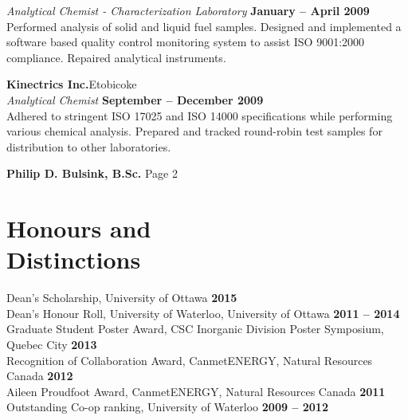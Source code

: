 \documentclass[margin,line]{resume}
\begin{document}
\begin{resume}
    \textsl{Analytical Chemist - Characterization Laboratory} \hfill \textbf{January -- April 2009}\\
    Performed analysis of solid and liquid fuel samples.
    Designed and implemented a software based quality control monitoring system to assist ISO 9001:2000 compliance.
    Repaired analytical instruments.

    \textbf{Kinectrics Inc.}\hfill Etobicoke\\\vspace{1mm}%
    \textsl{Analytical Chemist} \hfill \textbf{September -- December 2009}\\
    Adhered to stringent ISO 17025 and ISO 14000 specifications while performing various chemical analysis.
    Prepared and tracked round-robin test samples for distribution to other laboratories.

\newpage
	\textbf{Philip D. Bulsink, B.Sc.} \hspace{279pt} Page 2 \\
	\vspace{-4mm}
    \section{\mysidestyle Honours and\\Distinctions} 

	Dean's Scholarship, University of Ottawa \hfill \textbf{2015}\vspace{1mm}\\
    Dean's Honour Roll, University of Waterloo, University of Ottawa \hfill \textbf{2011 -- 2014}\vspace{1mm}\\%
    Graduate Student Poster Award, CSC Inorganic Division Poster Symposium, Quebec City \hfill \textbf{2013}\vspace{1mm}\\%
    Recognition of Collaboration Award, CanmetENERGY, Natural Resources Canada \hfill \textbf{2012}\vspace{1mm}\\%
    Aileen Proudfoot Award, CanmetENERGY, Natural Resources Canada \hfill \textbf{2011}\vspace{1mm}\\%
    Outstanding Co-op ranking, University of Waterloo \hfill \textbf{2009 -- 2012}\vspace{1mm}%



\end{resume}
\end{document}
